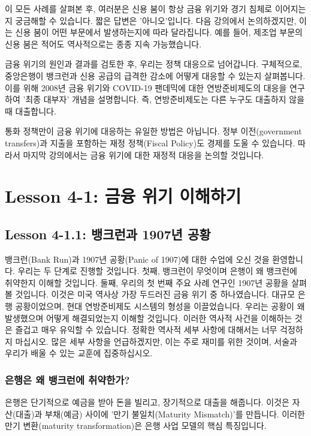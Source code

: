 \documentclass[11pt,a4paper]{book}
\theoremstyle{definition}
\begin{document}
이 모든 사례를 살펴본 후, 여러분은 신용 붐이 항상 금융 위기와 경기 침체로 이어지는지 궁금해할 수 있습니다. 짧은 답변은 '아니오'입니다. 다음 강의에서 논의하겠지만, 이는 신용 붐이 어떤 부문에서 발생하는지에 따라 달라집니다. 예를 들어, 제조업 부문의 신용 붐은 적어도 역사적으로는 종종 지속 가능했습니다.

금융 위기의 원인과 결과를 검토한 후, 우리는 정책 대응으로 넘어갑니다. 구체적으로, 중앙은행이 뱅크런과 신용 공급의 급격한 감소에 어떻게 대응할 수 있는지 살펴봅니다. 이를 위해 2008년 금융 위기와 COVID-19 팬데믹에 대한 연방준비제도의 대응을 연구하여 '최종 대부자' 개념을 설명합니다. 즉, 연방준비제도는 다른 누구도 대출하지 않을 때 대출합니다.

통화 정책만이 금융 위기에 대응하는 유일한 방법은 아닙니다. 정부 이전(government transfers)과 지출을 포함하는 재정 정책(Fiscal Policy)도 경제를 도울 수 있습니다. 따라서 마지막 강의에서는 금융 위기에 대한 재정적 대응을 논의할 것입니다.


\section{Lesson 4-1: 금융 위기 이해하기}

\subsection{Lesson 4-1.1: 뱅크런과 1907년 공황}
뱅크런(Bank Run)과 1907년 공황(Panic of 1907)에 대한 수업에 오신 것을 환영합니다. 우리는 두 단계로 진행할 것입니다. 첫째, 뱅크런이 무엇이며 은행이 왜 뱅크런에 취약한지 이해할 것입니다. 둘째, 우리의 첫 번째 주요 사례 연구인 1907년 공황을 살펴볼 것입니다. 이것은 미국 역사상 가장 두드러진 금융 위기 중 하나였습니다. 대규모 은행 공황이었으며, 현대 연방준비제도 시스템의 형성을 이끌었습니다. 우리는 공황이 왜 발생했으며 어떻게 해결되었는지 이해할 것입니다. 이러한 역사적 사건을 이해하는 것은 즐겁고 매우 유익할 수 있습니다. 정확한 역사적 세부 사항에 대해서는 너무 걱정하지 마십시오. 많은 세부 사항을 언급하겠지만, 이는 주로 재미를 위한 것이며, 서술과 우리가 배울 수 있는 교훈에 집중하십시오.

\subsubsection*{은행은 왜 뱅크런에 취약한가?}
은행은 단기적으로 예금을 받아 돈을 빌리고, 장기적으로 대출을 해줍니다. 이것은 자산(대출)과 부채(예금) 사이에 '만기 불일치(Maturity Mismatch)'를 만듭니다. 이러한 만기 변환(maturity transformation)은 은행 사업 모델의 핵심 특징입니다.
\end{document}
